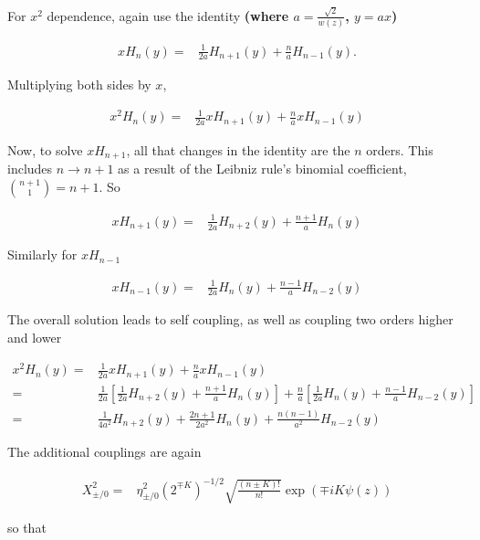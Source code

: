 \documentclass[aps,twoside,secnumarabic,balancelastpage,amsmath,amssymb,nofootinbib,hyperref=pdftex]{revtex4}
\begin{document}
For $x^2$ dependence, again use the identity \textbf{(where $a = \frac{\sqrt{2}}{w(z)}$, $y = ax$)}

\begin{align*}
x H_n(y) =&
		\frac{1}{2a}
	H_{n+1}(y)
	+
	\frac{n}{a} H_{n-1} (y).
\end{align*}

Multiplying both sides by $x$,

\begin{align*}
x^2 H_n(y)
	=&
		\frac{1}{2a}
	x H_{n+1}(y)
	+
	\frac{n}{a} x H_{n-1} (y)
\end{align*}

Now, to solve $xH_{n+1}$, all that changes in the identity are the $n$ orders. This includes $n \rightarrow n+1$ as a result of the Leibniz rule's binomial coefficient, $ {n+1 \choose 1} = n+1$. So

\begin{align*}
x H_{n+1}(y) =&
		\frac{1}{2a}
	H_{n+2}(y)
	+
	\frac{n+1}{a} H_{n} (y)
\end{align*}

Similarly for $xH_{n-1}$

\begin{align*}
x H_{n-1}(y) =&
		\frac{1}{2a}
	H_{n}(y)
	+
	\frac{n-1}{a} H_{n-2} (y)
\end{align*}

The overall solution leads to self coupling, as well as coupling two orders higher and lower

\begin{align*}
x^2 H_n(y)
	=&
		\frac{1}{2a} 
		x H_{n+1}(y)
	+
	\frac{n}{a} x H_{n-1} (y)
	\\	=&
		\frac{1}{2a}
		\left[
		\frac{1}{2a}
		H_{n+2}(y)
		+
		\frac{n+1}{a} H_{n} (y)
	\right]
	+
	\frac{n}{a} 
	\left[
		\frac{1}{2a}
		H_{n}(y)
		+
		\frac{n-1}{a} H_{n-2} (y)
	\right]
	\\ = &
	\frac{1}{4a^2} H_{n+2} (y)
	+
	\frac{2n+1}{2a^2} H_{n}(y)
	+
	\frac{n(n-1)}{a^2} H_{n-2}(y)
\end{align*}

The additional couplings are again

\begin{align*}
	X_{\pm/0}^2 = &
	\eta_{\pm/0}^2	
		(2^{\mp K} )^{-1/2}
		\sqrt{\frac{(n \pm K)!}{n!} }
		\exp(\mp iK  \psi(z))
\end{align*}

so that
\end{document}
